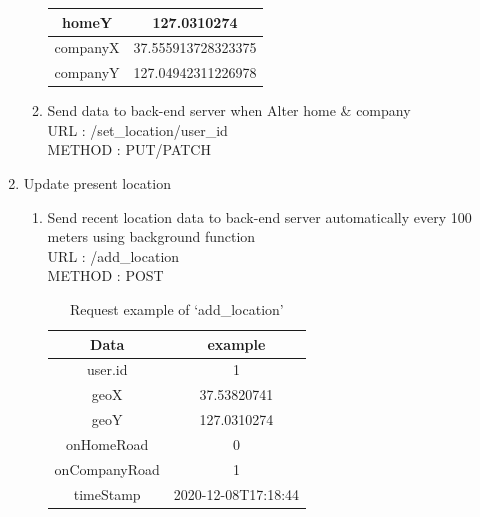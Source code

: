 \documentclass[conference]{IEEEtran}
\begin{document}
\begin{enumerate}
\begin{enumerate}
\begin{table}[htbp]
\begin{center}
\begin{tabular}{|c|c|}
        homeY    & 127.0310274        \\ \hline
        companyX & 37.555913728323375        \\ \hline
        companyY & 127.04942311226978        \\ \hline
        \end{tabular}
        \end{center}
        \end{table}
        \item Send data to back-end server when Alter home & company\\
        URL : /set\_location/user\_id \\
        METHOD : PUT/PATCH\\
    \end{enumerate}
    
    \item Update present location
    \begin{enumerate}
        \item Send recent location data to back-end server automatically every 100 meters using background function\\
    URL : /add\_location\\
    METHOD : POST
       \begin{table}[htbp]
       \caption{Request example of ‘add\_location’}
        \begin{center}
        \begin{tabular}{|c|c|}
        \hline
        Data     & example \\ \hline
        user.id  & 1       \\ \hline
        geoX    & 37.53820741       \\ \hline
        geoY    & 127.0310274        \\ \hline
        onHomeRoad & 0        \\ \hline
        onCompanyRoad &1       \\ \hline
        timeStamp&2020-12-08T17:18:44 \\ \hline
        \end{tabular}
        \end{center}
        \end{table}
        
    \end{enumerate}
    

\end{enumerate}
\end{document}

